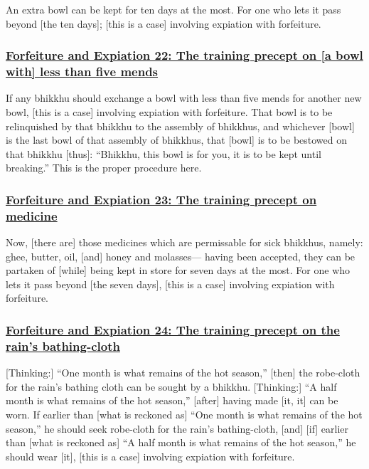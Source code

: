 An extra bowl can be kept for ten days at the most. For one who lets it pass beyond [the ten days]; [this is a case] involving expiation with forfeiture.



\subsubsection*{\hyperref[np22]{Forfeiture and Expiation 22: The training precept on [a bowl with] less than five mends}}
\label{forf-exp22}

If any bhikkhu should exchange a bowl with less than five mends for another new bowl, [this is a case] involving expiation with forfeiture. That bowl is to be relinquished by that bhikkhu to the assembly of bhikkhus, and whichever [bowl] is the last bowl of that assembly of bhikkhus, that [bowl] is to be bestowed on that bhikkhu [thus]: ``Bhikkhu, this bowl is for you, it is to be kept until breaking.'' This is the proper procedure here.



\subsubsection*{\hyperref[np23]{Forfeiture and Expiation 23: The training precept on medicine}}
\label{forf-exp23}

Now, [there are] those medicines which are permissable for sick bhikkhus, namely: ghee, butter, oil, [and] honey and molasses— having been accepted, they can be partaken of [while] being kept in store for seven days at the most. For one who lets it pass beyond [the seven days], [this is a case] involving expiation with forfeiture.



\subsubsection*{\hyperref[np24]{Forfeiture and Expiation 24: The training precept on the rain's bathing-cloth}}
\label{forf-exp24}

[Thinking:] ``One month is what remains of the hot season,'' [then] the robe-cloth for the rain's bathing cloth can be sought by a bhikkhu. [Thinking:] ``A half month is what remains of the hot season,'' [after] having made [it, it] can be worn. If earlier than [what is reckoned as] ``One month is what remains of the hot season,'' he should seek robe-cloth for the rain's bathing-cloth, [and] [if] earlier than [what is reckoned as] ``A half month is what remains of the hot season,'' he should wear [it], [this is a case] involving expiation with forfeiture.



